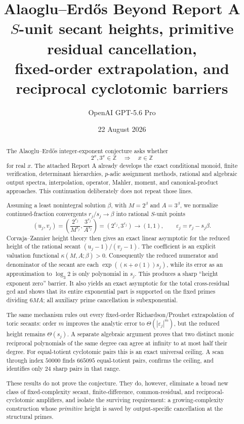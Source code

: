 \documentclass[11pt,oneside]{article}
\title{\bfseries Alaoglu--Erd\H{o}s Beyond Report A\\[0.35em]
\Large $S$-unit secant heights, primitive residual cancellation,\\
fixed-order extrapolation, and reciprocal cyclotomic barriers}
\author{OpenAI GPT-5.6 Pro}
\date{22 August 2026}
\theoremstyle{definition}
\theoremstyle{remark}
\newcommand{\Z}{\mathbb Z}
\newcommand{\eps}{\varepsilon}
\begin{document}
\maketitle

\begin{abstract}
The Alaoglu--Erd\H{o}s integer-exponent conjecture asks whether
\[
  2^x,3^x\in\Z \quad\Longrightarrow\quad x\in\Z
\]
for real $x$.  The attached Report A already develops the exact conditional monoid,
finite verification, determinant hierarchies, $p$-adic assignment methods, rational and
algebraic output spectra, interpolation, operator, Mahler, moment, and canonical-product
approaches.  This continuation deliberately does not repeat those lines.

Assuming a least nonintegral solution $\beta$, with $M=2^\beta$ and $A=3^\beta$, we
normalize continued-fraction convergents $r_j/s_j\to\beta$ into rational $S$-unit points
\[
 (u_j,v_j)=\left(\frac{2^{r_j}}{M^{s_j}},\frac{3^{r_j}}{A^{s_j}}\right)
           =(2^{\eps_j},3^{\eps_j})\longrightarrow(1,1),
 \qquad \eps_j=r_j-s_j\beta.
\]
Corvaja--Zannier height theory then gives an exact linear asymptotic for the reduced height
of the rational secant $(u_j-1)/(v_j-1)$.  The coefficient is an explicit valuation
functional $\kappa(M,A;\beta)>0$.  Consequently the reduced numerator and denominator of the
secant are each $\exp((\kappa+o(1))s_j)$, while its error as an approximation to
$\log_3 2$ is only polynomial in $s_j$.  This produces a sharp ``height exponent zero''
barrier.  It also yields an exact asymptotic for the total cross-residual gcd and shows that
its entire exponential part is supported on the fixed primes dividing $6MA$; all auxiliary
prime cancellation is subexponential.

The same mechanism rules out every fixed-order Richardson/Prouhet extrapolation of toric
secants: order $m$ improves the analytic error to $\Theta(|\eps_j|^m)$, but the reduced
height remains $\Theta(s_j)$.  A separate algebraic argument proves that two distinct monic
reciprocal polynomials of the same degree can agree at infinity to at most half their degree.
For equal-totient cyclotomic pairs this is an exact universal ceiling.  A scan through index
$50000$ finds $665095$ equal-totient pairs, confirms the ceiling, and identifies only $24$
sharp pairs in that range.

These results do not prove the conjecture.  They do, however, eliminate a broad new class of
fixed-complexity secant, finite-difference, common-residual, and reciprocal-cyclotomic
amplifiers, and isolate the surviving requirement: a growing-complexity construction whose
\emph{primitive} height is saved by output-specific cancellation at the structural primes.
\end{abstract}
\end{document}
